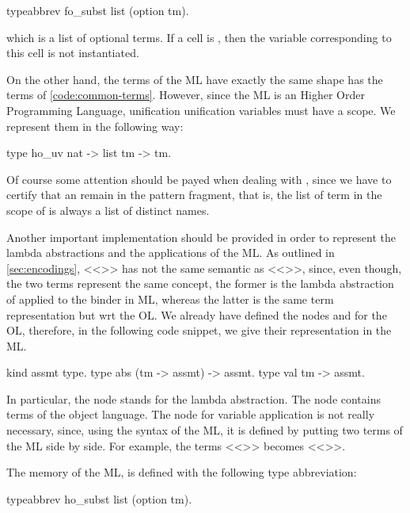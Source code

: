 \documentclass[sigconf,natbib=false]{acmart}
\begin{document}
\begin{elpicode}
  typeabbrev fo_subst list (option tm).
\end{elpicode}

\noindent 
which is a list of optional terms. If a cell is , then the variable
corresponding to this cell is not instantiated.

On the other hand, the terms of the ML have exactly the same shape
has the terms of \cref{code:common-terms}. However, since the ML is an Higher
Order Programming Language, unification unification variables must have a scope.
We represent them in the following way:

\begin{elpicode}
  type ho_uv nat -> list tm -> tm.
\end{elpicode}

Of course some attention
should be payed when dealing with , since we have to certify
that an  remain in the pattern fragment, that is, the
list of term in the scope of  is always a list of distinct names.

Another important implementation should be provided in order to represent the
lambda abstractions and the applications of the ML. As outlined in
\cref{sec:encodings}, <<>> has not the same semantic as 
<<>>, since, even though, the two terms represent the same
concept, the former is the lambda abstraction of  applied to the 
binder in ML, whereas the latter is the same term representation but wrt the OL.
We already have defined the nodes  and  for the OL,
therefore, in the following code snippet, we give their representation in the
ML.

\begin{elpicode}
  kind assmt type.
  type abs (tm -> assmt) -> assmt.
  type val tm -> assmt.
\end{elpicode}

\noindent
In particular, the node  stands for the lambda abstraction. The
node  contains terms of the object language. The node for variable
application is not really necessary, since, using the syntax of the ML, it is
defined by putting two terms of the ML side by side. For example, the terms 
<<>> becomes <<>>.

The memory of the ML, is defined with the following type abbreviation:

\begin{elpicode}
  typeabbrev ho_subst list (option tm).
\end{elpicode}
\end{document}
